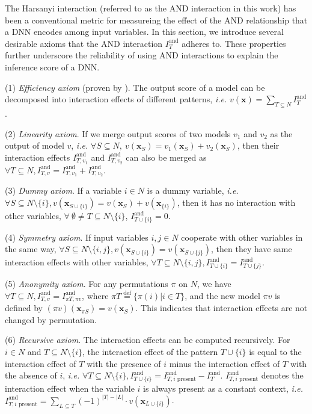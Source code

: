 \documentclass[10pt,twocolumn,letterpaper]{article}
\begin{document}
The Harsanyi interaction \cite{harsanyi1963} (referred to as the AND interaction in this work) has been a conventional metric for measureing the effect of the AND relationship that a DNN encodes among input variables. In this section, we introduce several desirable axioms that the AND interaction {\small$I^{\text{and}}_T$} adheres to. These properties further underscore the reliability of using AND interactions to explain the inference score of a DNN.


(1) \textit{Efficiency axiom} (proven by \cite{harsanyi1963}). The output score of a model can be decomposed into interaction effects of different patterns, \emph{i.e.} {\small $v(\mathbf{x})=\sum_{T\subseteq N}I^{\text{and}}_T$}.

(2) \textit{Linearity axiom}. If we merge output scores of two models $v_1$ and $v_2$ as the output of model $v$, \emph{i.e.} {\small $\forall S\subseteq N,~ v(\mathbf{x}_S)=v_1(\mathbf{x}_S)+v_2(\mathbf{x}_S)$}, then their interaction effects {\small $I^{\text{and}}_{T, v_1}$} and {\small $I^{\text{and}}_{T, v_2}$} can also be merged as {\small $\forall T\subseteq N, I^{\text{and}}_{T, v}=I^{\text{and}}_{T, v_1} + I^{\text{and}}_{T, v_2}$}.

(3) \textit{Dummy axiom}. If a variable {\small $i\in N$} is a dummy variable, \emph{i.e.} {\small $\forall S\subseteq N\setminus\{i\}, v(\mathbf{x}_{S\cup\{i\}})=v(\mathbf{x}_S)+v(\mathbf{x}_{\{i\}})$}, then it has no interaction with other variables, {\small $\forall \ \emptyset\not= T\subseteq N\setminus\{i\}$, $I^{\text{and}}_{T\cup\{i\}}=0$}.

(4) \textit{Symmetry axiom}. If input variables {\small $i,j\in N$} cooperate with other variables in the same way, {\small $\forall S\subseteq N\setminus\{i,j\}, v(\mathbf{x}_{S\cup\{i\}})=v(\mathbf{x}_{S\cup\{j\}})$}, then they have same interaction effects with other variables, {\small $\forall T\subseteq N\setminus\{i,j\}, I^{\text{and}}_{T\cup\{i\}} = I^{\text{and}}_{T\cup\{j\}}$}.

(5) \textit{Anonymity axiom}. For any permutations $\pi$ on {\small $N$}, we have {\small $\forall T \!\subseteq\! N, I^{\text{and}}_{T, v}=I^{\text{and}}_{\pi T, \pi v}$}, where {\small $\pi T \overset{\text{def}}{=} \{\pi(i) | i \in T\}$}, and the new model {\small $\pi v$} is defined by {\small $(\pi v)(\mathbf{x}_{\pi S}) = v(\mathbf{x}_S)$}. This indicates that interaction effects are not changed by permutation.

(6) \textit{Recursive axiom}. The interaction effects can be computed recursively. For {\small $i\in N$} and {\small $T\subseteq N\setminus\{i\}$}, the interaction effect of the pattern {\small $T\cup\{i\}$} is equal to the interaction effect of {\small $T$} with the presence of $i$ minus the interaction effect of $T$ with the absence of $i$, \emph{i.e.} {\small $\forall T\!\subseteq\! N\!\setminus\!\{i\}, I^{\text{and}}_{T\cup \{i\}}=I^{\text{and}}_{T, i\text{ present}} - I^{\text{and}}_T$}. {\small $I^{\text{and}}_{T, i\text{ present}}$} denotes the interaction effect when the variable $i$ is always present as a constant context, \emph{i.e.} {\small $I^{\text{and}}_{T, i\text{ present}}=\sum_{L\subseteq T} (-1)^{|T|-|L|}\cdot v(\mathbf{x}_{L\cup\{i\}})$}.
\end{document}
